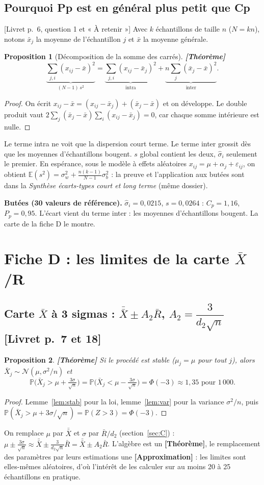 \documentclass[11pt,a4paper]{article}
\theoremstyle{tq}
\newtheorem{prop}{Proposition}
\theoremstyle{remark}
\newcommand{\thm}{\textcolor{vertTQ}{\textbf{[Théorème]}}}
\newcommand{\appr}{\textcolor{uimmred}{\textbf{[Approximation]}}}
\newcommand{\liv}[1]{\textcolor{uimmblue}{\small[Livret p.~#1]}}
\newcommand{\E}{\mathbb{E}}
\renewcommand{\P}{\mathbb{P}}
\newcommand{\N}{\mathcal{N}}
\newcommand{\Xb}{\bar{X}}
\newcommand{\Xbb}{\bar{\bar{X}}}
\newcommand{\Rb}{\bar{R}}
\begin{document}
\subsection{Pourquoi Pp est en général plus petit que Cp}\label{sec:PpCp}
\liv{6, question 1 et « À retenir »} Avec $k$ échantillons de taille $n$ ($N=kn$), notons $\bar x_j$ la moyenne de l'échantillon $j$ et $\bar x$ la moyenne générale.
\begin{prop}[Décomposition de la somme des carrés]\thm{}
\[
\underbrace{\sum_{j,i}(x_{ij}-\bar x)^2}_{(N-1)\,s^2}=\underbrace{\sum_{j,i}(x_{ij}-\bar x_j)^2}_{\text{intra}}+\underbrace{n\sum_j(\bar x_j-\bar x)^2}_{\text{inter}} .
\]
\end{prop}
\begin{proof}
On écrit $x_{ij}-\bar x=(x_{ij}-\bar x_j)+(\bar x_j-\bar x)$ et on développe. Le double produit vaut $2\sum_j(\bar x_j-\bar x)\sum_i(x_{ij}-\bar x_j)=0$, car chaque somme intérieure est nulle.
\end{proof}
Le terme intra ne voit que la dispersion court terme. Le terme inter grossit dès que les moyennes d'échantillons bougent. $s$ global contient les deux, $\hat\sigma_i$ seulement le premier. En espérance, sous le modèle à effets aléatoires $x_{ij}=\mu+\alpha_j+\varepsilon_{ij}$, on obtient $\E(s^2)=\sigma_w^2+\frac{n(k-1)}{N-1}\sigma_b^2$ : la preuve et l'application aux butées sont dans la \emph{Synthèse écarts-types court et long terme} (même dossier).

\textbf{Butées (30 valeurs de référence).} $\hat\sigma_i=0{,}0215$, $s=0{,}0264$ : $C_p=1{,}16$, $P_p=0{,}95$. L'écart vient du terme inter : les moyennes d'échantillons bougent. La carte de la fiche D le montre.

\section{Fiche D : les limites de la carte $\bar X$/R}\label{sec:D}

\subsection{Carte $\bar X$ à 3 sigmas : $\Xbb\pm A_2\Rb$, $A_2=\dfrac{3}{d_2\sqrt n}$ \liv{7 et 18}}
\begin{prop}\thm{}
Si le procédé est stable ($\mu_j=\mu$ pour tout $j$), alors $\Xb_j\sim\N(\mu,\sigma^2/n)$ et
\[
\P\Big(\Xb_j>\mu+\tfrac{3\sigma}{\sqrt n}\Big)=\P\Big(\Xb_j<\mu-\tfrac{3\sigma}{\sqrt n}\Big)=\Phi(-3)\approx1{,}35\text{ pour }1\,000 .
\]
\end{prop}
\begin{proof}
Lemme~\ref{lem:stab} pour la loi, lemme~\ref{lem:var} pour la variance $\sigma^2/n$, puis $\P(\Xb_j>\mu+3\sigma/\sqrt n)=\P(Z>3)=\Phi(-3)$.
\end{proof}
On remplace $\mu$ par $\Xbb$ et $\sigma$ par $\Rb/d_2$ (section~\ref{sec:C}) :
$\mu\pm\frac{3\sigma}{\sqrt n}\approx\Xbb\pm\frac{3}{d_2\sqrt n}\Rb=\Xbb\pm A_2\Rb$. L'algèbre est un \thm{}, le remplacement des paramètres par leurs estimations une \appr{} : les limites sont elles-mêmes aléatoires, d'où l'intérêt de les calculer sur au moins 20 à 25 échantillons en pratique.
\end{document}
